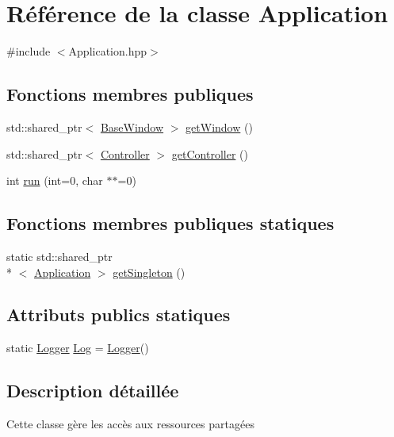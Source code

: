 \hypertarget{classApplication}{\section{Référence de la classe Application}
\label{classApplication}
}


{\ttfamily \#include $<$Application.\+hpp$>$}

\subsection*{Fonctions membres publiques}
\begin{DoxyCompactItemize}
\item 
std\+::shared\+\_\+ptr$<$ \hyperlink{classBaseWindow}{Base\+Window} $>$ \hyperlink{classApplication_ad4798575ca24d11794fb69ec7f1f5f84}{get\+Window} ()
\item 
std\+::shared\+\_\+ptr$<$ \hyperlink{classController}{Controller} $>$ \hyperlink{classApplication_a43268edea6339ba39334f55a7a6331e2}{get\+Controller} ()
\item 
int \hyperlink{classApplication_a9d50af9dd5d791e9e7f9236cee871dce}{run} (int=0, char $\ast$$\ast$=0)
\end{DoxyCompactItemize}
\subsection*{Fonctions membres publiques statiques}
\begin{DoxyCompactItemize}
\item 
static std\+::shared\+\_\+ptr\\*
$<$ \hyperlink{classApplication}{Application} $>$ \hyperlink{classApplication_afa5d5ce6c9369e1ea05ee6540fe07dc2}{get\+Singleton} ()
\end{DoxyCompactItemize}
\subsection*{Attributs publics statiques}
\begin{DoxyCompactItemize}
\item 
static \hyperlink{structLogger}{Logger} \hyperlink{classApplication_a1c7bdac46cde844f659892276949dca7}{Log} = \hyperlink{structLogger}{Logger}()
\end{DoxyCompactItemize}


\subsection{Description détaillée}
Cette classe gère les accès aux ressources partagées 

